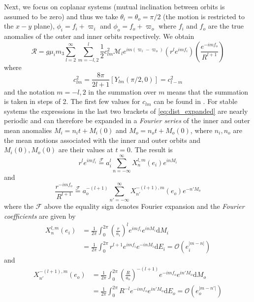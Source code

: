 Next, we focus on coplanar systems
(mutual inclination between orbits is assumed to be zero) and thus we take
$\theta_i=\theta_o=\pi/2$ (the motion is restricted to the $x-y$ plane), 
$\phi_i=f_i+\varpi_i$ and $\phi_o=f_o+\varpi_o$ where $f_i$ and $f_o$ are
the true anomalies of the outer and inner orbits respectively. We obtain 
\begin{equation}
    \mathcal{R}=g\mu_im_3\sum^\infty_{l=2}\sum^l_{m=-l,2} \frac{1}{2} c_{lm}^2\mathcal{M}_l
    e^{im(\varpi_i-\varpi_o)}\left(r^le^{imf_i}\right)\left( \frac{e^{-imf_o}}{R^{l+1}} 
    \right)
    \label{eq:dist_expanded}
\end{equation}
where
\begin{equation}
    c^2_{lm}= \frac{8\pi}{2l+1} \left[Y_{lm}(\pi/2,0)\right]=c^2_{l-m}
\end{equation}
and the notation $m=-l, 2$ in the summation over $m$ means that the summation is taken
in steps of 2. The first few values for $c_{lm}$ can be found in \cite{Mardling2013}.
For stable systems the expressions in the last two brackets of
\cref{eq:dist_expanded} are nearly periodic and can therefore be expanded in a 
\emph{Fourier series} of the inner and outer mean anomalies $M_i=n_it+M_i(0)$ and
$M_o=n_ot+M_o(0)$, where $n_i,n_o$ are the mean motions associated with the inner
and outer orbits and $M_i(0),M_o(0)$ are their values at $t=0$.  The result is
\begin{equation}
    r^le^{imf_i}\stackrel{\mathcal{F}}{=}a_i^l\sum^\infty_{n=-\infty}X^{l,m}_n(e_i)e^{inM_i}
    \label{eq:expansion_1}
\end{equation}
and
\begin{equation}
    \frac{r^{-imf_o}}{R^{l+1}} \stackrel{\mathcal{F}}{=}a_o^{-(l+1)}\sum^\infty_{n'=-\infty}
    X^{-(l+1),m}_{n'}(e_o)e^{-n'M_o}
    \label{eq:expansion_2}
\end{equation}
where the $\mathcal{F}$ above the equality sign denotes Fourier expansion 
and the \emph{Fourier coefficients} are given by
\begin{equation}
    \begin{aligned}
        X^{l,m}_n(e_i)&= \frac{1}{2\pi} \int^{2\pi}_0 \left(\frac{r}{a_i}\right)^l
        e^{imf_i}e^{inM_i}\mathrm{d}M_i\\[4pt]
        &=\frac{1}{2\pi}\int^{2\pi}_0r^{l+1} e^{imf_i}e^{-inM_i}\mathrm{d}E_i
=    \mathcal{O}(e_i^{\lvert m-n\rvert})
    \label{eq:hansen_inner}
    \end{aligned}
\end{equation}
and
\begin{equation}
    \begin{aligned}
        X^{-(l+1),m}_{n'}(e_o)&= \frac{1}{2\pi} \int^{2\pi}_0 \left( \frac{R}{a_o}
        \right)^{-(l+1)}e^{-imf_o}e^{in'M_o}\mathrm{d}M_o\\[4pt]
        &=\frac{1}{2\pi}\int^{2\pi}_0R^{-l} e^{-imf_o}e^{in'M_o}\mathrm{d}E_o
        =\mathcal{O}(e_o^{\lvert m-n'\rvert})
    \end{aligned}
    \label{eq:hansen_outer}
\end{equation}

